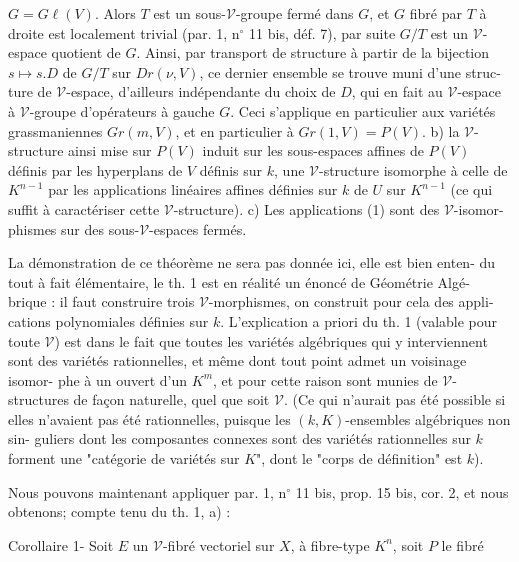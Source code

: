 
$G = G\ell(V)$. Alors $T$ est un sous-$\mathcal{V}$-groupe fermé dans $G$, et $G$ fibré par $T$ à
droite est localement trivial (par. 1, n$^\circ$ 11 bis, déf. 7), par suite $G/T$ est un $\mathcal{V}$-
espace quotient de $G$. Ainsi, par transport de structure à partir de la bijection
$s \mapsto s.D$ de $G/T$ sur $Dr(\nu, V)$, ce dernier ensemble se trouve muni d'une struc-
ture de $\mathcal{V}$-espace, d'ailleurs indépendante du choix de $D$, qui en fait au $\mathcal{V}$-espace
à $\mathcal{V}$-groupe d'opérateurs à gauche $G$. Ceci s'applique en particulier aux variétés
grassmaniennes $Gr(m,V)$, et en particulier à $Gr(1,V) = P(V)$. b) la $\mathcal{V}$-structure
ainsi mise sur $P(V)$ induit sur les sous-espaces affines de $P(V)$ définis par les
hyperplans de $V$ définis sur $k$, une $\mathcal{V}$-structure isomorphe à celle de $K^{n-1}$ par
les applications linéaires affines définies sur $k$ de $U$ sur $K^{n-1}$ (ce qui suffit
à caractériser cette $\mathcal{V}$-structure). c) Les applications (1) sont des $\mathcal{V}$-isomor-
phismes sur des sous-$\mathcal{V}$-espaces fermés.

La démonstration de ce théorème ne sera pas donnée ici, elle est bien enten-
du tout à fait élémentaire, le th. 1 est en réalité un énoncé de Géométrie Algé-
brique : il faut construire trois $\mathcal{V}$-morphismes, on construit pour cela des appli-
cations polynomiales définies sur $k$. L'explication a priori du th. 1 (valable pour
toute $\mathcal{V}$) est dans le fait que toutes les variétés algébriques qui y interviennent
sont des variétés rationnelles, et même dont tout point admet un voisinage isomor-
phe à un ouvert d'un $K^m$, et pour cette raison sont munies de $\mathcal{V}$-structures de
façon naturelle, quel que soit $\mathcal{V}$. (Ce qui n'aurait pas été possible si elles
n'avaient pas été rationnelles, puisque les $(k,K)$-ensembles algébriques non sin-
guliers dont les composantes connexes sont des variétés rationnelles sur $k$ forment
une "catégorie de variétés sur $K$", dont le "corps de définition" est $k$).

Nous pouvons maintenant appliquer par. 1, n$^\circ$ 11 bis, prop. 15 bis, cor. 2, et
nous obtenons; compte tenu du th. 1, a) :

Corollaire 1- Soit $E$ un $\mathcal{V}$-fibré vectoriel sur $X$, à fibre-type $K^n$, soit $P$ le fibré

\newpage


